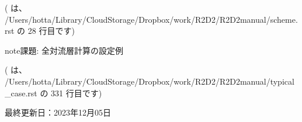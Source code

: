 \documentclass[letterpaper,10pt,dvipdfmx,report]{sphinxmanual}
\begin{document}
\sphinxAtStartPar
({\hyperref[\detokenize{scheme:id6}]{}} は、 /Users/hotta/Library/CloudStorage/Dropbox/work/R2D2/R2D2\sphinxhyphen{}manual/scheme.rst の 28 行目です)

\begin{sphinxadmonition}{note}{課題:}
\sphinxAtStartPar
全対流層計算の設定例
\end{sphinxadmonition}

\sphinxAtStartPar
({\hyperref[\detokenize{typical_case:id10}]{}} は、 /Users/hotta/Library/CloudStorage/Dropbox/work/R2D2/R2D2\sphinxhyphen{}manual/typical\_case.rst の 331 行目です)

\sphinxAtStartPar
最終更新日：2023年12月05日


\renewcommand{\indexname}{Pythonモジュール索引}
\begin{sphinxtheindex}
\let\bigletter\sphinxstyleindexlettergroup
\bigletter{r}
\item\relax{}
\end{sphinxtheindex}

\renewcommand{\indexname}{索引}
\printindex
\end{document}
